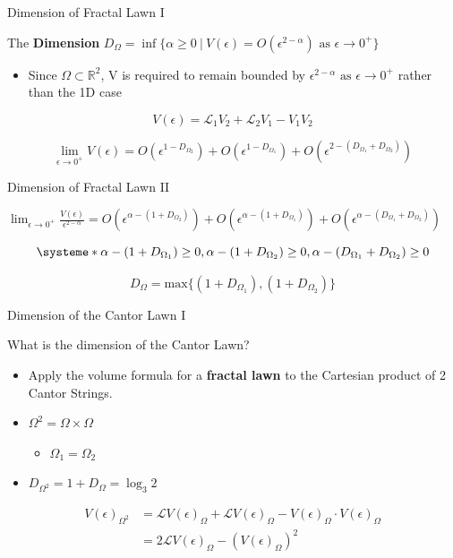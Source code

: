 \documentclass{if-beamer}
\newcommand{\R}{\mathbb{R}}
\newcommand{\SL}{\mathcal{L}}
\newcommand{\Om}{\Omega}
\begin{document}
\begin{frame}{Dimension of Fractal Lawn I}

\begin{definition}
	The {\bf Dimension} $D_{\Om} = \inf\{\alpha \geq 0\ |\ V(\epsilon) = O(\epsilon^{2 - \alpha})\text{ as }\epsilon \to 0^+\}$
\end{definition}
\pause
\begin{itemize}
	\item Since $\Om \subset \R^2$, V is required to remain bounded by $\epsilon^{2-\alpha} \text{ as }\epsilon \to 0^+ $ rather than the 1D case   
\end{itemize}
\pause
\vspace{0.2in}

	\[ V(\epsilon) = \SL_1 V_2 + \SL_2 V_1 - V_1 V_2 \]
	\pause
	
	\[ \lim_{\epsilon \to 0^+} V(\epsilon) = O(\epsilon^{1-D_{\Om_2}}) + O(\epsilon^{1-D_{\Om_1}}) + O(\epsilon^{2-(D_{\Om_1} + D_{\Om_2})})  \]
	
\end{frame}

\begin{frame}{Dimension of Fractal Lawn II}

$\displaystyle \lim_{\epsilon \to 0^+} \frac{V(\epsilon)}{\epsilon^{2-\alpha}} = O(\epsilon^{\alpha - (1+D_{\Om_2})}) + O(\epsilon^{\alpha - (1+D_{\Om_1})}) + O(\epsilon^{\alpha - (D_{\Om_1} + D_{\Om_2})})$
\pause

\[ 
\systeme*{\alpha - (1 + D_{\Om_1}) \geq 0, \alpha - (1 + D_{\Om_2}) \geq 0, \alpha - (D_{\Om_1} + D_{\Om_2}) \geq 0}
\]
\pause

\[ 
D_{\Om} = \text{max} \{ (1 + D_{\Om_1}), (1 + D_{\Om_2}) \}
\]

\end{frame}

\begin{frame}{Dimension of the Cantor Lawn I}

What is the dimension of the Cantor Lawn? \\
\pause
\begin{itemize}
\item Apply the volume formula for a {\bf fractal lawn} to the Cartesian product of 2 Cantor Strings.
\pause 

\item $\Om^2 = \Om \times \Om $
	\pause
	\begin{itemize}
	\item $\Om_1 = \Om_2 $
	\end{itemize}
\pause

\item $D_{\Om^2} = 1 + D_{\Om} = \log_3 2 $
\end{itemize}
\pause

\begin{align*}
V(\epsilon)_{\Om^2} &= \SL V(\epsilon)_{\Om} + \SL V(\epsilon)_{\Om} - V(\epsilon)_{\Om} \cdot V(\epsilon)_{\Om} \\
&= 2 \SL V(\epsilon)_{\Om} - (V(\epsilon)_{\Om})^2
\end{align*}

\end{frame}
\end{document}
